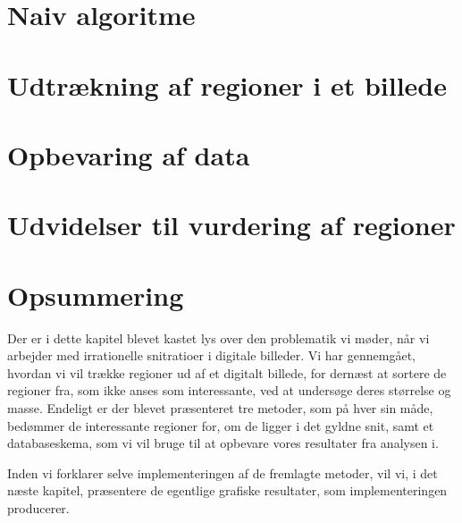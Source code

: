 {\section{Naiv algoritme\label{section_naiv}}


\section{Udtrækning af regioner i et billede\label{section_udtraek}}


\section{Opbevaring af data\label{section_database}}


\section{Udvidelser til vurdering af regioner\label{section_udvidelser}}


\section*{Opsummering}
Der er i dette kapitel blevet kastet lys over den problematik vi møder,
når vi arbejder med irrationelle snitratioer i digitale billeder. Vi har
gennemgået, hvordan vi vil trække regioner ud af et digitalt billede,
for dernæst at sortere de regioner fra, som ikke anses som interessante,
ved at undersøge deres størrelse og masse.  Endeligt er der blevet
præsenteret tre metoder, som på hver sin måde, bedømmer de interessante
regioner for, om de ligger i det gyldne snit, samt et databaseskema, som
vi vil bruge til at opbevare vores resultater fra analysen i.

Inden vi forklarer selve implementeringen af de fremlagte metoder, vil
vi, i det næste kapitel, præsentere de egentlige grafiske resultater,
som implementeringen producerer.

}

